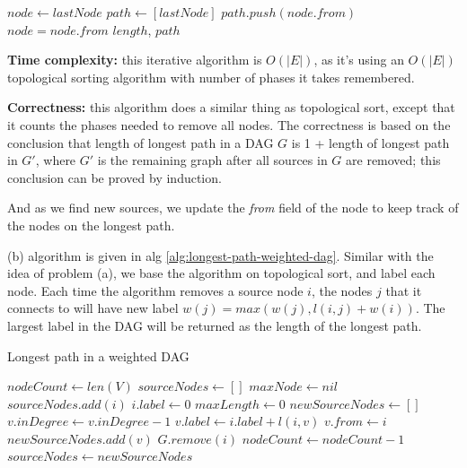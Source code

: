 \documentclass{article}
\begin{document}
\begin{description}
\begin{algorithm}[h]
\begin{algorithmic}[1]
      \State $node \gets lastNode$
      \State $path \gets [lastNode]$
        \State $path.push(node.from)$
        \State $node = node.from$
      \EndWhile
      \State \Return $length$, $path$
    \EndFunction
    
    \end{algorithmic}
  \end{algorithm}

  \textbf{Time complexity:} this iterative algorithm is $O(|E|)$, as it's using an $O(|E|)$ topological sorting algorithm with number of phases it takes remembered. 

  \textbf{Correctness:} this algorithm does a similar thing as topological sort, except that it counts the phases needed to remove all nodes. The correctness is based on the conclusion that length of longest path in a DAG $G$ is 1 + length of longest path in $G'$, where $G'$ is the remaining graph after all sources in $G$ are removed; this conclusion can be proved by induction. 

  And as we find new sources, we update the \textit{from} field of the node to keep track of the nodes on the longest path.

  (b) algorithm is given in alg \ref{alg:longest-path-weighted-dag}. Similar with the idea of problem (a), we base the algorithm on topological sort, and label each node. Each time the algorithm removes a source node $i$, the nodes $j$ that it connects to will have new label $w(j) = max(w(j), l(i,j) + w(i))$. The largest label in the DAG will be returned as the length of the longest path. 

  \begin{algorithm}[h]
  \caption{Longest path in a weighted DAG}
  \label{alg:longest-path-weighted-dag}
    \begin{algorithmic}[1]
  
      \State $nodeCount \gets len(V)$
      \State $sourceNodes \gets []$
      \State $maxNode \gets nil$
          \State $sourceNodes.add(i)$
          \State $i.label \gets 0$
        \EndIf
      \EndFor
      \State $maxLength \gets 0$
        \State $newSourceNodes \gets []$
            \State $v.inDegree \gets v.inDegree - 1$
              \State $v.label \gets i.label + l(i,v)$
              \State $v.from \gets i$
            \EndIf
            \EndIf
              \State $newSourceNodes.add(v)$
            \EndIf
          \EndFor
          \State $G.remove(i)$
          \State $nodeCount \gets nodeCount - 1$
        \EndFor
        \State $sourceNodes \gets newSourceNodes$
      \EndWhile


\end{algorithmic}
\end{algorithm}
\end{description}
\end{document}
